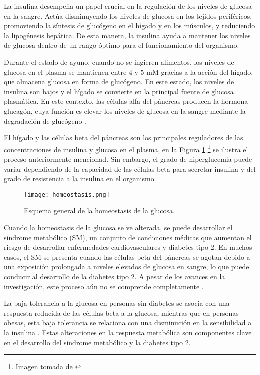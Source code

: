 La insulina desempeña un papel crucial en la regulación de los niveles de glucosa en la sangre. Actúa disminuyendo los niveles de glucosa en los tejidos periféricos, promoviendo la síntesis de glucógeno en el hígado y en los músculos, y reduciendo la lipogénesis hepática. De esta manera, la insulina ayuda a mantener los niveles de glucosa dentro de un rango óptimo para el funcionamiento del organismo.

Durante el estado de ayuno, cuando no se ingieren alimentos, los niveles de glucosa en el plasma se mantienen entre $4$ y $5$ mM gracias a la acción del hígado, que almacena glucosa en forma de glucógeno. En este estado, los niveles de insulina son bajos y el hígado se convierte en la principal fuente de glucosa plasmática. En este contexto, las células alfa del páncreas producen la hormona glucagón, cuya función es elevar los niveles de glucosa en la sangre mediante la degradación de glucógeno \cite{unamHomeostasis}.

El hígado y las células beta del páncreas son los principales reguladores de las concentraciones de insulina y glucosa en el plasma, en la Figura \ref{fig:homeostasis} \footnote{Imagen tomada de \cite{ImgHomeos}} se ilustra el proceso anteriormente mencionad. Sin embargo, el grado de hiperglucemia puede variar dependiendo de la capacidad de las células beta para secretar insulina y del grado de resistencia a la insulina en el organismo.

\begin{figure}[H]
    \centering
    \texttt{[image: homeostasis.png]}
    \caption{Esquema general de la homeostasis de la glucosa.}
    \label{fig:homeostasis}
\end{figure}

Cuando la homeostasis de la glucosa se ve alterada, se puede desarrollar el síndrome metabólico (SM), un conjunto de condiciones médicas que aumentan el riesgo de desarrollar enfermedades cardiovasculares y diabetes tipo 2. En muchos casos, el SM se presenta cuando las células beta del páncreas se agotan debido a una exposición prolongada a niveles elevados de glucosa en sangre, lo que puede conducir al desarrollo de la diabetes tipo 2. A pesar de los avances en la investigación, este proceso aún no se comprende completamente \cite{capitulo4Metabolic}.

La baja tolerancia a la glucosa en personas sin diabetes se asocia con una respuesta reducida de las células beta a la glucosa, mientras que en personas obesas, esta baja tolerancia se relaciona con una disminución en la sensibilidad a la insulina \cite{computational}. Estas alteraciones en la respuesta metabólica son componentes clave en el desarrollo del síndrome metabólico y la diabetes tipo 2.

